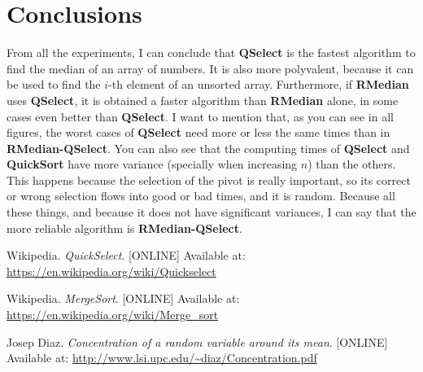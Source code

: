 \documentclass[letterpaper,12pt]{article}
\begin{document}
\section{Conclusions}
From all the experiments, I can conclude that \textbf{QSelect} is the fastest algorithm to find the median of an array of numbers. It is also more polyvalent, because it can be used to find the $i$-th element of an unsorted array. Furthermore, if \textbf{RMedian} uses \textbf{QSelect}, it is obtained a faster algorithm than \textbf{RMedian} alone, in some cases even better than \textbf{QSelect}. I want to mention that, as you can see in all figures, the worst cases of \textbf{QSelect} need more or less the same times than in \textbf{RMedian-QSelect}. You can also see that the computing times of \textbf{QSelect} and \textbf{QuickSort} have more variance (specially when increasing $n$) than the others. This happens because the selection of the pivot is really important, so its correct or wrong selection flows into good or bad times, and it is random. Because all these things, and because it does not have significant variances, I can say that the more reliable algorithm is \textbf{RMedian-QSelect}.

\begin{thebibliography}{9}

     Wikipedia. \emph{QuickSelect}. [ONLINE] Available at: \url{https://en.wikipedia.org/wiki/Quickselect}

     Wikipedia. \emph{MergeSort}. [ONLINE] Available at: \url{https://en.wikipedia.org/wiki/Merge_sort}

     Josep Diaz. \emph{Concentration of a random variable around its
    mean}. [ONLINE] Available at: \url{http://www.lsi.upc.edu/~diaz/Concentration.pdf}

\end{thebibliography}
\end{document}
